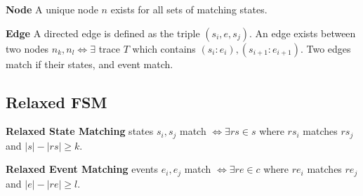\noindent\textbf{Node} A unique node $n$ exists for all sets of matching states.

\noindent\textbf{Edge} A directed edge is defined as the triple $(s_i, e,
s_j)$. An edge exists between two nodes $n_k, n_l \iff \exists$ trace $T$ which
contains $(s_i:e_i),(s_{i+1}:e_{i+1})$. Two edges match if their states, and event
match.

\subsection{Relaxed FSM}

\noindent\textbf{Relaxed State Matching} states $s_i, s_j$ match $\iff \exists
rs \in s$ where $rs_i$ matches $rs_j$ and $|s| - |rs| \geq k$.

\noindent\textbf{Relaxed Event Matching} events $e_i, e_j$ match $\iff \exists
re \in c$ where $re_i$ matches $re_j$ and $|e| - |re| \geq l$.

